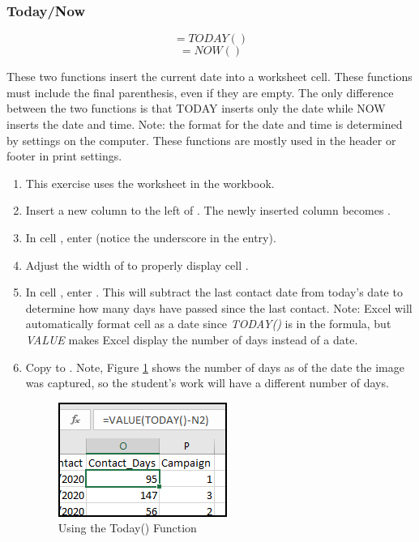 \subsubsection{Today/Now}

\[ =TODAY() \]
\[ =NOW() \]

These two functions insert the current date into a worksheet cell. These functions must include the final parenthesis, even if they are empty. The only difference between the two functions is that TODAY inserts only the date while NOW inserts the date and time. Note: the format for the date and time is determined by settings on the computer. These functions are mostly used in the header or footer in print settings.

\begin{enumerate}
	\item This exercise uses the  worksheet in the  workbook.
	\item Insert a new column to the left of . The newly inserted column becomes .
	\item In cell , enter  (notice the underscore in the entry).
	\item Adjust the width of  to properly display cell .
	\item In cell , enter . This will subtract the last contact date from today's date to determine how many days have passed since the last contact. Note: Excel will automatically format cell  as a date since \textit{TODAY()} is in the formula, but \textit{VALUE} makes Excel display the number of days instead of a date.
	\item Copy  to . Note, Figure \ref{09:fig45} shows the number of days as of the date the image was captured, so the student's work will have a different number of days.
	
	\begin{figure}[H]
		\centering
		\includegraphics[width=\maxwidth{.50\linewidth}]{gfx/ch09_fig45}
		\caption{Using the Today() Function}
		\label{09:fig45}
	\end{figure}
	
\end{enumerate}

